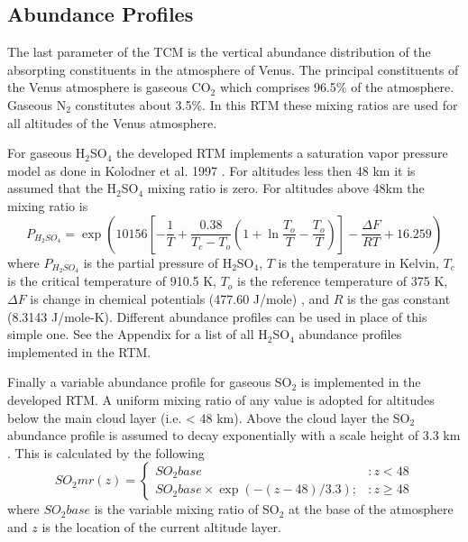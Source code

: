 \subsection{Abundance Profiles}
The last parameter of the TCM is the vertical abundance distribution of the absorpting constituents in the atmosphere of Venus. The principal constituents of the Venus atmosphere is gaseous CO$_2$ which comprises 96.5\% of the atmosphere. Gaseous N$_2$ constitutes about 3.5\%. In this RTM these mixing ratios are used for all altitudes of the Venus atmosphere. 

For gaseous H$_2$SO$_4$ the developed RTM implements a saturation vapor pressure model as done in Kolodner et al. 1997 \cite{Kolodner-thesis}. For altitudes less then 48 km it is assumed that the H$_2$SO$_4$ mixing ratio is zero. For altitudes above 48km the mixing ratio is
\begin{equation}
P_{H_2SO_4} = \exp\left(10156\left[ -\frac{1}{T}+ \frac{0.38}{T_c-T_o}\left(1+\ln\frac{T_o}{T} - \frac{T_o}{T}\right) \right] - \frac{\Delta F}{R T} + 16.259 \right)
\end{equation}
where $P_{H_2SO_4}$ is the partial pressure of H$_2$SO$_4$, $T$ is the temperature in Kelvin, $T_c$ is the critical temperature of 910.5 K, $T_o$ is the reference temperature of 375 K, $\Delta F$ is change in chemical potentials (477.60 J/mole) \cite{Giauque-1960}, and $R$ is the gas constant (8.3143 J/mole-K). Different abundance profiles can be used in place of this simple one. See the Appendix for a list of all H$_2$SO$_4$ abundance profiles implemented in the RTM.

Finally a variable abundance profile for gaseous SO$_2$ is implemented in the developed RTM. A uniform mixing ratio of any value is adopted for altitudes below the main cloud layer (i.e. < 48 km). Above the cloud layer the SO$_2$ abundance profile is assumed to decay exponentially with a scale height of 3.3 km \cite{Na-1994}. This is calculated by the following
\begin{equation}
SO_2mr(z) = \left\{
     \begin{array}{lr}
       SO_2base & : z < 48\\
       SO_2base\times\exp(-(z-48)/3.3); & : z\geq 48
     \end{array}
   \right.
\end{equation}
where $SO_2base$ is the variable mixing ratio of SO$_2$ at the base of the atmosphere and $z$ is the location of the current altitude layer.


